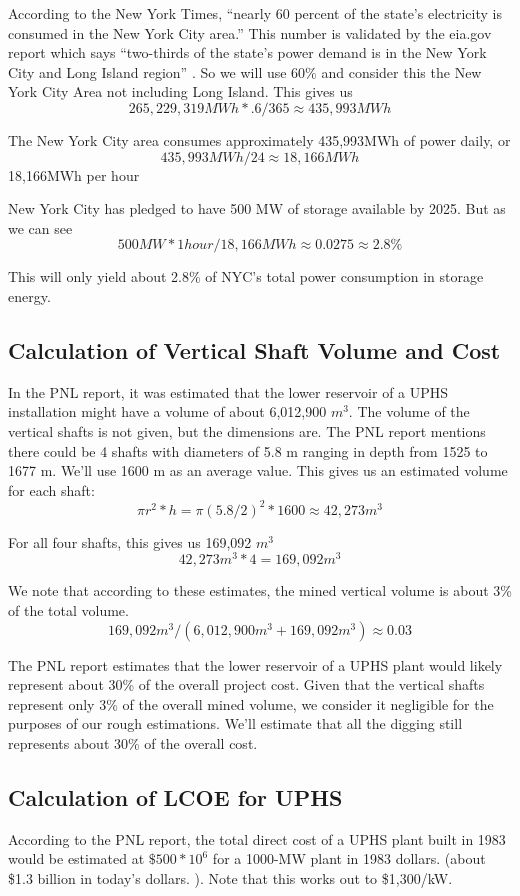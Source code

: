 According to the New York Times, “nearly 60 percent of the state’s electricity is consumed in the New York City area.” \cite{HowNewYorkCityGetsItsElectricity} This number is validated by the eia.gov report which says “two-thirds of the state's power demand is in the New York City and Long Island region” \cite{NewYorkStateEnergyProfile}. So we will use 60\% and consider this the New York City Area not including Long Island. This gives us
\[ 265,229,319MWh * .6  / 365 \approx 435,993MWh \]

The New York City area consumes approximately 435,993MWh of power daily, or
\[ 435,993MWh / 24 \approx 18,166MWh \]
18,166MWh per hour

New York City has pledged to have 500 MW of storage available by 2025. But as we can see
\[ 500MW * 1 hour / 18,166MWh \approx 0.0275 \approx 2.8\% \]

This will only yield about 2.8\% of NYC's total power consumption in storage energy.


\subsection{Calculation of Vertical Shaft Volume and Cost}
In the PNL report, it was estimated that the lower reservoir of a UPHS installation might have a volume of about 6,012,900 $m^3$. The volume of the vertical shafts is not given, but the dimensions are. The PNL report mentions there could be 4 shafts with diameters of 5.8 m ranging in depth from 1525 to 1677 m. \cite{UndergroundPumpedHydroelectricStorage} We'll use 1600 m as an average value. This gives us an estimated volume for each shaft:
\[ \pi r^2 * h = \pi (5.8 / 2)^2 * 1600 \approx 42,273 m^3\]

For all four shafts, this gives us 169,092 $m^3$
\[ 42,273 m^3 * 4 = 169,092 m^3\]

We note that according to these estimates, the mined vertical volume is about 3\% of the total volume.
\[ 169,092 m^3 / (6,012,900 m^3 + 169,092 m^3) \approx 0.03 \]

The PNL report estimates that the lower reservoir of a UPHS plant would likely represent about 30\% of the overall project cost. \cite{UndergroundPumpedHydroelectricStorage} Given that the vertical shafts represent only 3\% of the overall mined volume, we consider it negligible for the purposes of our rough estimations. We'll estimate that all the digging still represents about 30\% of the overall cost.


\subsection{Calculation of LCOE for UPHS}
According to the PNL report, the total direct cost of a UPHS plant built in 1983 would be estimated at $\$500 * 10^6$ for a 1000-MW plant in 1983 dollars.\cite{UndergroundPumpedHydroelectricStorage} (about \$1.3 billion in today's dollars. \cite{CPIInflationCalculator}). Note that this works out to \$1,300/kW.

